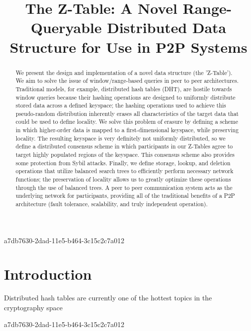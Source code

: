 \documentclass[12pt]{article}
\title{The Z-Table: A Novel Range-Queryable Distributed Data Structure for Use in P2P Systems}
\begin{document}
a7db7630-2dad-11e5-b464-3c15c2c7a012\maketitle

\begin{abstract}
We present the design and implementation of a novel data structure (the 'Z-Table'). We aim to solve the issue of window/range-based queries in peer to peer architectures. Traditional models, for example,  distributed hash tables (DHT), are hostile towards window queries because their hashing operations are designed to uniformly distribute stored data across a defined keyspace; the hashing operations used to achieve this pseudo-random distribution inherently erases all characteristics of the target data that could be used to define locality. We solve this problem of erasure by defining a scheme in which higher-order data is mapped to a first-dimensional keyspace, while preserving locality. The resulting keyspace is very definitely not uniformly distributed, so we define a distributed consensus scheme in which participants in our Z-Tables agree to target highly populated regions of the keyspace. This consensus scheme also provides some protection from Sybil attacks. Finally, we define storage, lookup, and deletion operations that utilize balanced search trees to efficiently perform necessary network functions; the preservation of locality allows us to greatly optimize these operations through the use of balanced trees. A peer to peer communication system acts as the underlying network for participants, providing all of the traditional benefits of a P2P architecture (fault tolerance, scalability, and truly independent operation).
\end{abstract}


\newpage
\section{Introduction}
Distributed hash tables are currently one of the hottest topics in the cryptography space~\cite{Stoica:2001dj,Rowstron:2001ea,Ratnasamy:2001wn}

\printbibliography
a7db7630-2dad-11e5-b464-3c15c2c7a012
\end{document}
